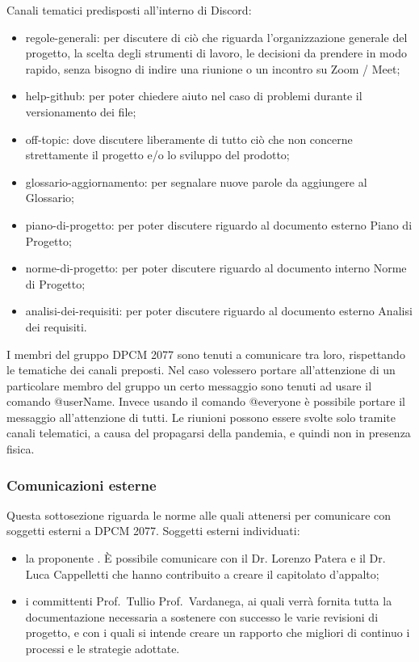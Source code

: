 Canali tematici predisposti all'interno di Discord:
\begin{itemize}
\item{regole-generali: per discutere di ciò che riguarda l’organizzazione generale del progetto, la scelta degli strumenti di lavoro, le decisioni da prendere in modo rapido, senza bisogno di indire una riunione o un incontro  su Zoom / Meet;}
\item{help-github: per poter chiedere aiuto nel caso di problemi durante il versionamento dei file;}
\item{off-topic: dove discutere liberamente di tutto ciò che non concerne strettamente il progetto e/o lo sviluppo del prodotto;}
\item{glossario-aggiornamento: per segnalare nuove parole da aggiungere al Glossario;}
\item{piano-di-progetto: per poter discutere riguardo al documento esterno Piano di Progetto;}
\item{norme-di-progetto: per poter discutere riguardo al documento interno Norme di Progetto;}
\item{analisi-dei-requisiti: per poter discutere riguardo al documento esterno Analisi dei requisiti.}
\end{itemize}
I membri del gruppo DPCM 2077 sono tenuti a comunicare tra loro, rispettando le tematiche dei canali preposti. Nel caso volessero portare all’attenzione di un particolare membro del gruppo un certo messaggio sono tenuti ad usare
il comando @userName.
Invece usando il comando @everyone è possibile portare il messaggio all'attenzione di tutti.
Le riunioni possono essere svolte solo tramite canali telematici, a causa del propagarsi della pandemia, e quindi non in presenza fisica.

\subsubsection{Comunicazioni esterne}
Questa sottosezione riguarda le norme alle quali attenersi per comunicare con soggetti esterni a DPCM 2077.
Soggetti esterni individuati:
\begin{itemize}
\item{la proponente . È possibile comunicare con il Dr. Lorenzo Patera e il Dr. Luca Cappelletti che hanno contribuito a creare il capitolato d'appalto;}
\item{i committenti Prof.~Tullio Prof.~Vardanega, ai quali verrà fornita tutta la documentazione necessaria a sostenere con successo le varie revisioni di progetto, e con i quali si intende creare un rapporto che migliori 
di continuo i processi e le strategie adottate.}
\end{itemize}

